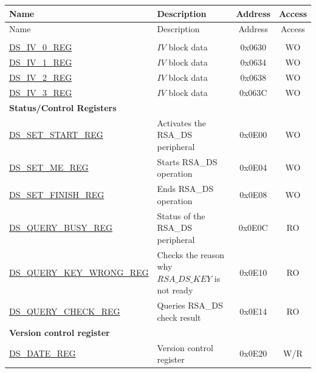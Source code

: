 


\begin{longtable}{ | p{5.2cm} | p{6.6cm} | c| c| }
\hline\rowcolor{lightgray}
Name & Description &  Address & Access \\ \hline
\endfirsthead
        \hline
        \rowcolor{lightgray}
Name & Description &  Address & Access \\ \hline

        \endhead
        \endfoot
\multicolumn{4}{|l|}{\textbf{Configuration Registers}} \\ \hline
\hyperref[regdesc:DSIVREG]{DS\_IV\_0\_REG}               & \begin{math}IV\end{math} block data         & 0x0630 & WO \\ \hline
\hyperref[regdesc:DSIVREG]{DS\_IV\_1\_REG}               & \begin{math}IV\end{math} block data          & 0x0634 & WO \\ \hline
\hyperref[regdesc:DSIVREG]{DS\_IV\_2\_REG}               & \begin{math}IV\end{math} block data          & 0x0638 & WO \\ \hline
\hyperref[regdesc:DSIVREG]{DS\_IV\_3\_REG}               & \begin{math}IV\end{math} block data           & 0x063C & WO \\ \hline
\multicolumn{4}{|l|}{\textbf{Status/Control Registers}} \\ \hline
\hyperref[regdesc:DSSETSTARTREG]{DS\_SET\_START\_REG}               & Activates the RSA\_DS peripheral     & 0x0E00 & WO \\ \hline
\hyperref[regdesc:DSSETMEREG]{DS\_SET\_ME\_REG}                     & Starts RSA\_DS operation       & 0x0E04 & WO \\ \hline
\hyperref[regdesc:DSSETFINISHREG]{DS\_SET\_FINISH\_REG}             & Ends RSA\_DS operation         & 0x0E08 & WO \\ \hline
\hyperref[regdesc:DSQUERYBUSYREG]{DS\_QUERY\_BUSY\_REG}             & Status of the RSA\_DS peripheral & 0x0E0C & RO \\ \hline
\hyperref[regdesc:DSQUERYKEYWRONGREG]{DS\_QUERY\_KEY\_WRONG\_REG}   & Checks the reason why \begin{math}RSA\_DS\_KEY\end{math} is not ready       & 0x0E10 & RO \\ \hline
\hyperref[regdesc:DSQUERYCHECKREG]{DS\_QUERY\_CHECK\_REG}           & Queries RSA\_DS check result    & 0x0E14 & RO \\ \hline
\multicolumn{4}{|l|}{\textbf{Version control register}} \\ \hline
\hyperref[regdesc:DSDATEREG]{DS\_DATE\_REG}                   & Version control register   & 0x0E20 & W/R \\ \hline
\end{longtable}
